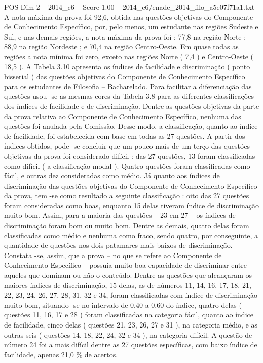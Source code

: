 \begin{textsample}{POS Dim 2 – 2014\_c6 – Score 1.00 – 2014\_c6/enade\_2014\_filo\_a5e07f71a1.txt}
A nota máxima da prova foi 92,6, obtida nas questões objetivas do Componente de Conhecimento Específico, por, pelo menos, um estudante nas regiões Sudeste e Sul, e nas demais regiões, a nota máxima da prova foi : 77,8 na região Norte ; 88,9 na região Nordeste ; e 70,4 na região Centro-Oeste.
Em quase todas as regiões a nota mínima foi zero, exceto nas regiões Norte ( 7,4 ) e Centro-Oeste ( 18,5 ).
A Tabela 3.10 apresenta os índices de facilidade e discriminação ( ponto bisserial ) das questões objetivas do Componente de Conhecimento Específico para os estudantes de Filosofia – Bacharelado.
Para facilitar a diferenciação das questões usou -se as mesmas cores da Tabela 3.8 para as diferentes classificações dos índices de facilidade e de discriminação.
Dentre as questões objetivas da parte da prova relativa ao Componente de Conhecimento Específico, nenhuma das questões foi anulada pela Comissão.
Desse modo, a classificação, quanto ao índice de facilidade, foi estabelecida com base em todas as 27 questões.
A partir dos índices obtidos, pode -se concluir que um pouco mais de um terço das questões objetivas da prova foi considerado difícil : das 27 questões, 13 foram classificadas como difícil ( a classificação modal ).
Quatro questões foram classificadas como fácil, e outras dez consideradas como médio.
Já quanto aos índices de discriminação das questões objetivas do Componente de Conhecimento Específico da prova, tem -se como resultado a seguinte classificação : oito das 27 questões foram consideradas como boas, enquanto 15 delas tiveram índice de discriminação muito bom.
Assim, para a maioria das questões – 23 em 27 – os índices de discriminação foram bom ou muito bom.
Dentre as demais, quatro delas foram classificadas como médio e nenhuma como fraco, sendo quatro, por conseguinte, a quantidade de questões nos dois patamares mais baixos de discriminação.
Constata -se, assim, que a prova – no que se refere ao Componente de Conhecimento Específico – possuía muito boa capacidade de discriminar entre aqueles que dominam ou não o conteúdo.
Dentre as questões que alcançaram os maiores índices de discriminação, 15 delas, as de números 11, 14, 16, 17, 18, 21, 22, 23, 24, 26, 27, 28, 31, 32 e 34, foram classificadas com índice de discriminação muito bom, situando -se no intervalo de 0,40 a 0,60 do índice, quatro delas ( questões 11, 16, 17 e 28 ) foram classificadas na categoria fácil, quanto ao índice de facilidade, cinco delas ( questões 21, 23, 26, 27 e 31 ), na categoria médio, e as outras seis ( questões 14, 18, 22, 24, 32 e 34 ), na categoria difícil.
A questão de número 24 foi a mais difícil dentre as 27 questões específicas, com baixo índice de facilidade, apenas 21,0 \% de acertos.

\end{textsample}
